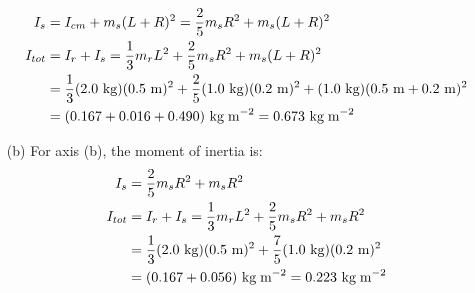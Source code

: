 \documentclass[a4paper]{article}
\newcommand\m{\text{ m}}
\newcommand\kg{\text{ kg}}
\newcommand\kgmm{\text{ kg\;m}^{-2}}
\begin{document}
\begin{shaded}
\begin{enumerate}
\begin{align*}
            I_s &= I_{cm} + m_s(L + R)^2 = \frac{2}{5}m_sR^2 + m_s(L + R)^2\\
            I_{tot} &= I_r + I_s = \frac{1}{3}m_rL^2 + \frac{2}{5}m_sR^2 + m_s(L + R)^2\\
            &= \frac{1}{3}(2.0\kg)(0.5\m)^2 + \frac{2}{5}(1.0\kg)(0.2\m)^2 + (1.0\kg)(0.5\m + 0.2\m)^2\\
            &= (0.167 + 0.016 + 0.490)\kgmm = 0.673\kgmm
        \end{align*}
        \item[(b)] For axis (b), the moment of inertia is:
        \begin{align*}
            I_s &= \frac{2}{5}m_sR^2 + m_sR^2\\
            I_{tot} &= I_r + I_s = \frac{1}{3}m_rL^2 + \frac{2}{5}m_sR^2 + m_sR^2\\
            &= \frac{1}{3}(2.0\kg)(0.5\m)^2 + \frac{7}{5}(1.0\kg)(0.2\m)^2\\
            &= (0.167 + 0.056)\kgmm = 0.223\kgmm
        \end{align*}
    \end{enumerate}
\end{shaded}
\end{document}
